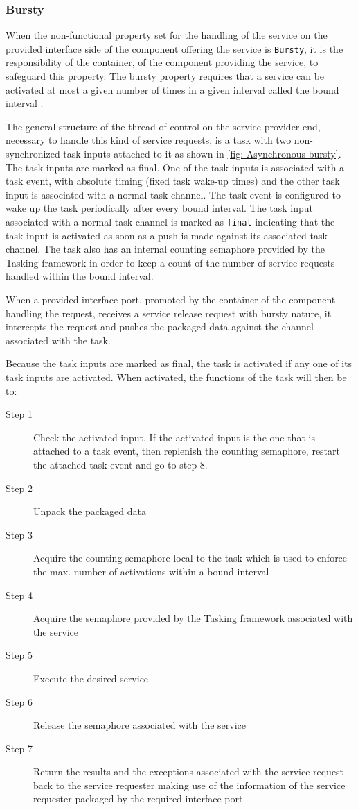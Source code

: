 \subsubsection{\textbf{Bursty}}
When the non-functional property set for the handling of the service on the provided interface side of the component offering the service is \texttt{Bursty}, it is the responsibility of the container, of the component providing the service, to safeguard this property. The bursty property requires that a service can be activated at most a given number of times in a given interval called the bound interval \cite{SpecMetamodel}\cite{CompBasedProcess}.

The general structure of the thread of control on the service provider end, necessary to handle this kind of service requests, is a task with two non-synchronized task inputs attached to it as shown in \cref{fig: Asynchronous bursty}. The task inputs are marked as final. One of the task inputs is associated with a task event, with absolute timing (fixed task wake-up times) and the other task input is associated with a normal task channel. The task event is configured to wake up the task periodically after every bound interval. The task input associated with a normal task channel is marked as \texttt{final} indicating that the task input is activated as soon as a push is made against its associated task channel. The task also has an internal counting semaphore provided by the Tasking framework in order to keep a count of the number of service requests handled within the bound interval.

When a provided interface port, promoted by the container of the component handling the request, receives a service release request with bursty nature, it intercepts the request and pushes the packaged data against the channel associated with the task.
  
Because the task inputs are marked as final, the task is activated if any one of its task inputs are activated. When activated, the functions of the task will then be to:

\begin{description}
\item [Step 1] Check the activated input. If the activated input is the one that is attached to a task event, then replenish the counting semaphore, restart the attached task event and go to step 8. 
\item [Step 2] Unpack the packaged data
\item [Step 3] Acquire the counting semaphore local to the task which is used to enforce the max. number of activations within a bound interval
\item [Step 4] Acquire the semaphore provided by the Tasking framework associated with the service
\item [Step 5] Execute the desired service
\item [Step 6] Release the semaphore associated with the service 
\item [Step 7]Return the results and the exceptions associated with the service request back to the service requester making use of the information of the service requester packaged by the required interface port 
\end{description}

